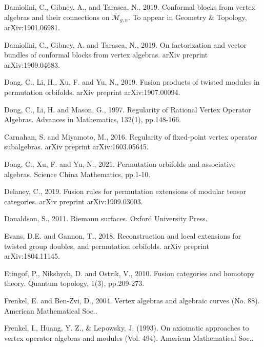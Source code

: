 \documentclass[12pt,a4paper,notitlepage]{article}
\theoremstyle{definition}
\theoremstyle{plain}
\newcommand{\mc}{\mathcal}
\newcommand{\ovl}{\overline}
\numberwithin{equation}{subsection}
\begin{document}
\begin{thebibliography}{999999}
Damiolini, C., Gibney, A., and Tarasca, N., 2019. Conformal blocks from vertex algebras and their connections on $\ovl{\mc M}_{g,n}$.  To appear in Geometry \& Topology, arXiv:1901.06981.

Damiolini, C., Gibney, A. and Tarasca, N., 2019. On factorization and vector bundles of conformal blocks from vertex algebras. arXiv preprint arXiv:1909.04683.



Dong, C., Li, H., Xu, F. and Yu, N., 2019. Fusion products of twisted modules in permutation orbifolds. arXiv preprint arXiv:1907.00094.
		
Dong, C., Li, H. and Mason, G., 1997. Regularity of Rational Vertex Operator Algebras. Advances in Mathematics, 132(1), pp.148-166.	



Carnahan, S. and Miyamoto, M., 2016. Regularity of fixed-point vertex operator subalgebras. arXiv preprint arXiv:1603.05645.


Dong, C., Xu, F. and Yu, N., 2021. Permutation orbifolds and associative algebras. Science China Mathematics, pp.1-10.



Delaney, C., 2019. Fusion rules for permutation extensions of modular tensor categories. arXiv preprint arXiv:1909.03003.


Donaldson, S., 2011. Riemann surfaces. Oxford University Press.

Evans, D.E. and Gannon, T., 2018. Reconstruction and local extensions for twisted group doubles, and permutation orbifolds. arXiv preprint arXiv:1804.11145.


Etingof, P., Nikshych, D. and Ostrik, V., 2010. Fusion categories and homotopy theory. Quantum topology, 1(3), pp.209-273.


Frenkel, E. and Ben-Zvi, D., 2004. Vertex algebras and algebraic curves (No. 88). American Mathematical Soc..


Frenkel, I., Huang, Y. Z., \& Lepowsky, J. (1993). On axiomatic approaches to vertex operator algebras and modules (Vol. 494). American Mathematical Soc..



\end{thebibliography}
\end{document}
